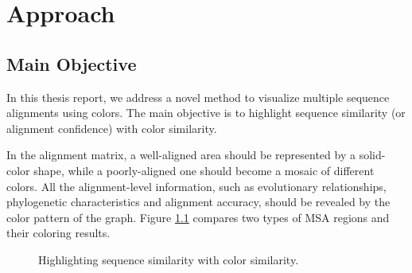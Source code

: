 \chapter{Approach}\label{chap:Approach}

\section{Main Objective}

In this thesis report, we address a novel method to visualize multiple sequence alignments using colors. The main objective is to highlight sequence similarity (or alignment confidence) with color similarity.

In the alignment matrix, a well-aligned area should be represented by a solid-color shape, while a poorly-aligned one should become a mosaic of different colors. All the alignment-level information, such as evolutionary relationships, phylogenetic characteristics and alignment accuracy, should be revealed by the color pattern of the graph. Figure \ref{fig:app-wa} compares two types of MSA regions and their coloring results.

\begin{figure}[hbt]
\centering
{}
\hspace{5mm}
\caption[Highlighting Sequence Similarity With Color Similarity]{Highlighting sequence similarity with color similarity.}\label{fig:app-wa}
\end{figure}

